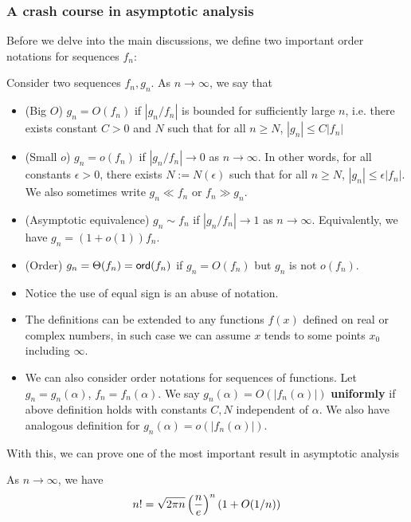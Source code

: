 \subsubsection{A crash course in asymptotic analysis}
Before we delve into the main discussions, we define two important order notations for sequences $f_n$:

\begin{definition} Consider two sequences $f_n, g_n$. As $n \to \infty$, we say that
\begin{itemize}
    \item (Big $O$) $g_n = O(f_n)$ if $|g_n/f_n|$ is bounded for sufficiently large $n$, i.e. there exists constant $C>0$ and $N$ such that for all $n \geq N$, $|g_n| \leq C|f_n|$
    \item (Small $o$) $g_n = o(f_n)$ if $|g_n/f_n| \to 0$ as $n \to \infty$. In other words, for all constants $\epsilon > 0$, there exists $N := N(\epsilon)$ such that for all $n \geq N$, $|g_n| \leq \epsilon |f_n|$. We also sometimes write $g_n \ll f_n$ or $f_n \gg g_n$.
    \item (Asymptotic equivalence) $g_n \sim f_n$ if $|g_n/f_n| \to 1$ as $n \to \infty$. Equivalently, we have $g_n = (1+o(1)) f_n$.
    \item (Order) $g_n = \Theta(f_n) = \mathsf{ord}(f_n)$ if $g_n = O(f_n)$ but $g_n$ is not $o(f_n)$.
\end{itemize}
\end{definition}

\begin{remark} \phantom{blah} 
\begin{itemize} 
    \item Notice the use of equal sign is an abuse of notation.
    \item The definitions can be extended to any functions $f(x)$ defined on real or complex numbers, in such case we can assume $x$ tends to some points $x_0$ including $\infty$.
    \item We can also consider order notations for sequences of functions. Let $g_n = g_n(\alpha)$, $f_n = f_n(\alpha)$. We say  $g_n(\alpha) = O(|f_n(\alpha)|)$ \textbf{uniformly} if above definition holds with constants $C,N$ independent of $\alpha$. We also have analogous definition for $g_n(\alpha) = o(|f_n(\alpha)|)$.
\end{itemize}
\end{remark}

With this, we can prove one of the most important result in asymptotic analysis
\begin{lemma}
As $n \to \infty$, we have
\begin{equation}
    n! = \sqrt{2\pi n} \left( \frac{n}{e} \right)^n \left( 1 + O(1/n) \right) 
\end{equation}
\end{lemma}

